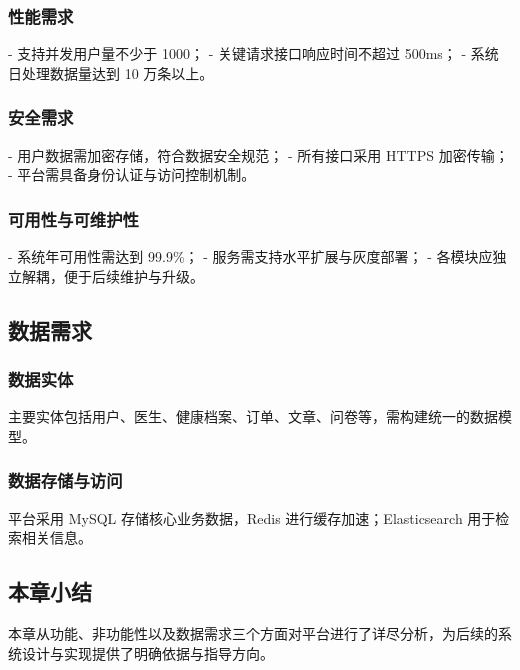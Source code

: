 \subsubsection{性能需求}
- 支持并发用户量不少于 1000；
- 关键请求接口响应时间不超过 500ms；
- 系统日处理数据量达到 10 万条以上。

\subsubsection{安全需求}
- 用户数据需加密存储，符合数据安全规范；
- 所有接口采用 HTTPS 加密传输；
- 平台需具备身份认证与访问控制机制。

\subsubsection{可用性与可维护性}
- 系统年可用性需达到 99.9\%；
- 服务需支持水平扩展与灰度部署；
- 各模块应独立解耦，便于后续维护与升级。

\subsection{数据需求}

\subsubsection{数据实体}
主要实体包括用户、医生、健康档案、订单、文章、问卷等，需构建统一的数据模型。

\subsubsection{数据存储与访问}
平台采用 MySQL 存储核心业务数据，Redis 进行缓存加速；Elasticsearch 用于检索相关信息。

\subsection{本章小结}

本章从功能、非功能性以及数据需求三个方面对平台进行了详尽分析，为后续的系统设计与实现提供了明确依据与指导方向。
